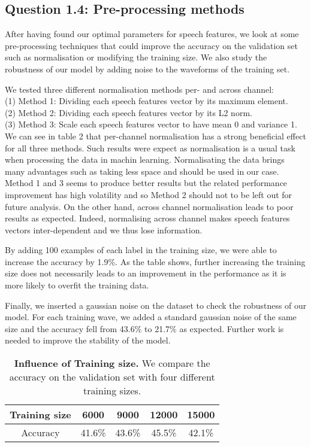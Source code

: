 \documentclass[9pt,twocolumn,letterpaper]{article}
\begin{document}
\subsection{Question 1.4: Pre-processing methods}
After having found our optimal parameters for speech features, we look at some pre-processing techniques that could improve the accuracy on the validation set such as normalisation or modifying the training size. We also study the robustness of our model by adding noise to the waveforms of the training set.\par We tested three different normalisation methods per- and across channel:\\
[2mm]
(1) Method 1: Dividing each speech features vector by its maximum element.\\
[2mm]
(2) Method 2: Dividing each speech features vector by its L2 norm.\\
[2mm]
(3)  Method 3: Scale each speech features vector to have mean 0 and variance 1.\\
[2mm]
We can see in table 2 that per-channel normalisation has a strong beneficial effect for all three methods. Such results were expect as normalisation is a usual task when processing the data in machin learning. Normalisating the data brings many advantages such as taking less space and should be used in our case.  Method 1 and 3 seems to produce better results but the related performance improvement has high volatility and so Method 2 should not to be left out for future analysis. On the other hand, across channel normalisation leads to poor results as expected. Indeed, normalising across channel makes speech features vectors inter-dependent and we thus lose information.\par
By adding 100 examples of each label in the training size, we were able to increase the accuracy by 1.9\%. As the table shows, further increasing the training size does not necessarily leads to an improvement in the performance as it is more likely to overfit the training data.\par
Finally, we inserted a gaussian noise on the dataset to check the robustness of our model. For each training wave, we added a standard gaussian noise of the same size and the accuracy fell from 43.6\% to 21.7\% as expected. Further work is needed to improve the stability of the model.



\begin{table}
\begin{center}
\begin{tabular}{|c|c|c|c|c|}
\hline
 Training size & 6000& 9000 &  12000 &  15000 \\
 \hline
Accuracy & 41.6\% & 43.6\% & 45.5\% & 42.1\% \\
 \hline
\end{tabular}
\end{center}
\caption{{\bf Influence of Training size.} We compare the accuracy on the validation set with four different training sizes.}
\end{table}
\end{document}
